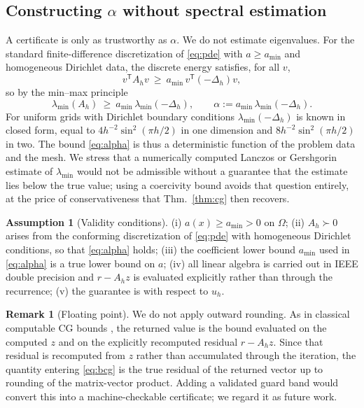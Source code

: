 \documentclass[journal]{IEEEtran}
\theoremstyle{plain}
\theoremstyle{definition}
\newtheorem{assumption}{Assumption}
\newtheorem{remark}{Remark}
\begin{document}
\subsection{Constructing $\alpha$ without spectral estimation}
A certificate is only as trustworthy as $\alpha$. We do not estimate eigenvalues.
For the standard finite-difference discretization of \eqref{eq:pde} with $a\ge a_{\min}$
and homogeneous Dirichlet data, the discrete energy satisfies, for all $v$,
\begin{equation}
v^{\mathsf T}A_h v\ \ge\ a_{\min}\, v^{\mathsf T}(-\Delta_h)v ,
\end{equation}
so by the min--max principle
\begin{equation}
\lambda_{\min}(A_h)\ \ge\ a_{\min}\,\lambda_{\min}(-\Delta_h),
\qquad
\alpha:=a_{\min}\,\lambda_{\min}(-\Delta_h).
\label{eq:alpha}
\end{equation}
For uniform grids with Dirichlet boundary conditions $\lambda_{\min}(-\Delta_h)$ is known
in closed form, equal to $4h^{-2}\sin^2(\pi h/2)$ in one dimension and
$8h^{-2}\sin^2(\pi h/2)$ in two. The bound \eqref{eq:alpha} is thus a deterministic
function of the problem data and the mesh. We stress that a numerically computed
Lanczos or Gershgorin estimate of $\lambda_{\min}$ would not be admissible without a
guarantee that the estimate lies below the true value; using a coercivity bound avoids
that question entirely, at the price of conservativeness that Thm.~\ref{thm:cg} then
recovers.

\begin{assumption}[Validity conditions]\label{ass:cg}
(i) $a(x)\ge a_{\min}>0$ on $\Omega$; (ii) $A_h\succ0$ arises from the conforming
discretization of \eqref{eq:pde} with homogeneous Dirichlet conditions, so that
\eqref{eq:alpha} holds; (iii) the coefficient lower bound $a_{\min}$ used in
\eqref{eq:alpha} is a true lower bound on $a$; (iv) all linear algebra is carried out
in IEEE double precision and $r-A_hz$ is evaluated explicitly rather than through the
recurrence; (v) the guarantee is with respect to $u_h$.
\end{assumption}

\begin{remark}[Floating point]
We do not apply outward rounding. As in classical computable CG bounds
\cite{meurant1999computable,meurant2013accuracy,jiranek2010posteriori}, the returned
value is the bound evaluated on the computed $z$ and on the explicitly recomputed
residual $r-A_hz$. Since that residual is recomputed from $z$ rather than accumulated
through the iteration, the quantity entering \eqref{eq:bcg} is the true residual of the
returned vector up to rounding of the matrix-vector product. Adding a validated guard
band would convert this into a machine-checkable certificate; we regard it as future work.
\end{remark}
\end{document}
